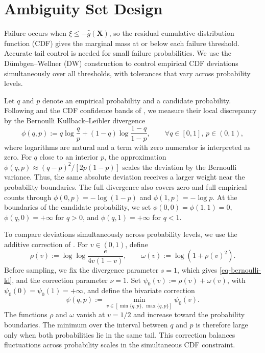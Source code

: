 \documentclass[review,11pt,3p,authoryear,nopreprintline]{elsarticle}
\begin{document}
\section{Ambiguity Set Design}
\label{sec-ambiguity-set}

Failure occurs when $\xi\le-\hat g(\bm X)$, so the residual cumulative distribution function (CDF) gives the marginal mass at or below each failure threshold. Accurate tail control is needed for small failure probabilities. We use the D\"umbgen--Wellner (DW) construction \citep{L.J23} to control empirical CDF deviations simultaneously over all thresholds, with tolerances that vary across probability levels.

Let $q$ and $p$ denote an empirical probability and a candidate probability. Following \citet{B.J79} and the CDF confidence bands of \citet{O95}, we measure their local discrepancy by the Bernoulli Kullback--Leibler divergence
\begin{equation}
  \phi(q,p):=q\log\frac{q}{p}+(1-q)\log\frac{1-q}{1-p},\qquad \forall q\in[0,1],\, p\in(0,1),
  \label{eq-bernoulli-kl}
\end{equation}
where logarithms are natural and a term with zero numerator is interpreted as zero. For $q$ close to an interior $p$, the approximation $\phi(q,p)\approx(q-p)^2/[2p(1-p)]$ scales the deviation by the Bernoulli variance. Thus, the same absolute deviation receives a larger weight near the probability boundaries. The full divergence also covers zero and full empirical counts through $\phi(0,p)=-\log(1-p)$ and $\phi(1,p)=-\log p$. At the boundaries of the candidate probability, we set $\phi(0,0)=\phi(1,1)=0$, $\phi(q,0)=+\infty$ for $q>0$, and $\phi(q,1)=+\infty$ for $q<1$.

To compare deviations simultaneously across probability levels, we use the additive correction of \citet{L.J23}. For $v\in(0,1)$, define
\begin{equation*}
  \rho(v):=\log\log\frac{e}{4v(1-v)},\qquad \omega(v):=\log\!\left(1+\rho(v)^2\right).
\end{equation*}
Before sampling, we fix the divergence parameter $s=1$, which gives \eqref{eq-bernoulli-kl}, and the correction parameter $\nu=1$. Set $\psi_0(v):=\rho(v)+\omega(v)$, with $\psi_0(0)=\psi_0(1)=+\infty$, and define the bivariate correction
\begin{equation*}
  \psi(q,p):=\min_{v\in[\min\{q,p\},\,\max\{q,p\}]}\psi_0(v).
\end{equation*}
The functions $\rho$ and $\omega$ vanish at $v=1/2$ and increase toward the probability boundaries. The minimum over the interval between $q$ and $p$ is therefore large only when both probabilities lie in the same tail. This correction balances fluctuations across probability scales in the simultaneous CDF constraint.
\end{document}
